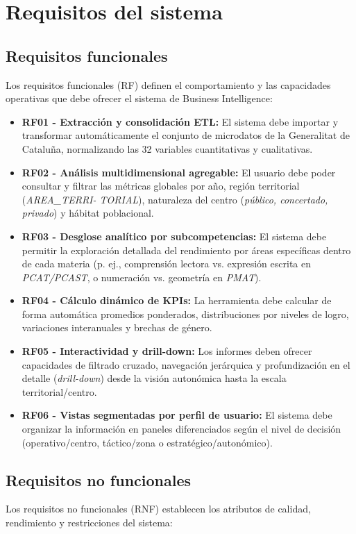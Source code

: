 \documentclass[12pt, a4paper, twoside]{report}
\begin{document}
\section{Requisitos del sistema}

\subsection{Requisitos funcionales}
Los requisitos funcionales (RF) definen el comportamiento y las capacidades operativas que debe ofrecer el sistema de Business Intelligence:

\begin{itemize}
    \item \textbf{RF01 - Extracción y consolidación ETL:} El sistema debe importar y transformar automáticamente el conjunto de microdatos de la Generalitat de Cataluña, normalizando las 32 variables cuantitativas y cualitativas.
    \item \textbf{RF02 - Análisis multidimensional agregable:} El usuario debe poder consultar y filtrar las métricas globales por año, región territorial (\textit{AREA\_TERRI-
    TORIAL}), naturaleza del centro (\textit{público, concertado, privado}) y hábitat poblacional.
    \item \textbf{RF03 - Desglose analítico por subcompetencias:} El sistema debe permitir la exploración detallada del rendimiento por áreas específicas dentro de cada materia (p. ej., comprensión lectora vs. expresión escrita en \textit{PCAT/PCAST}, o numeración vs. geometría en \textit{PMAT}).
    \item \textbf{RF04 - Cálculo dinámico de KPIs:} La herramienta debe calcular de forma automática promedios ponderados, distribuciones por niveles de logro, variaciones interanuales y brechas de género.
    \item \textbf{RF05 - Interactividad y drill-down:} Los informes deben ofrecer capacidades de filtrado cruzado, navegación jerárquica y profundización en el detalle (\textit{drill-down}) desde la visión autonómica hasta la escala territorial/centro.
    \item \textbf{RF06 - Vistas segmentadas por perfil de usuario:} El sistema debe organizar la información en paneles diferenciados según el nivel de decisión (operativo/centro, táctico/zona o estratégico/autonómico).
\end{itemize}

\subsection{Requisitos no funcionales}
Los requisitos no funcionales (RNF) establecen los atributos de calidad, rendimiento y restricciones del sistema:
\end{document}
